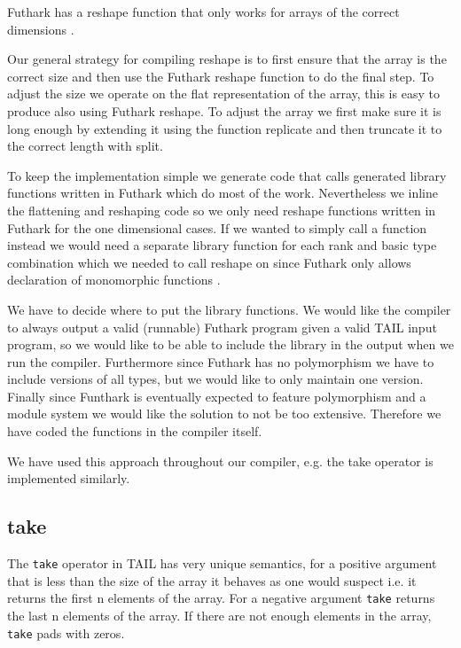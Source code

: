 \documentclass[11pt]{article}
\begin{document}
Futhark has a reshape function that only works for arrays of the correct dimensions \cite{TroelsHenriksen}.

Our general strategy for compiling reshape is to first ensure that the array is the correct size and then use the Futhark reshape
function to do the final step. To adjust the size we operate on the flat representation of the array, this is easy to produce also
using Futhark reshape. To adjust the array we first make sure it is long enough by extending it using the function replicate and then
truncate it to the correct length with split.

To keep the implementation simple we generate code that calls generated library functions written in Futhark which do most of the work.
Nevertheless we inline the flattening and reshaping code so we only need reshape functions written in Futhark
for the one dimensional cases. If we wanted to simply call a function instead we would need a separate library function for each
rank and basic type combination which we needed to call reshape on since Futhark only allows declaration of monomorphic functions \cite{TroelsHenriksen}.

We have to decide where to put the library functions.
We would like the compiler to always output a valid (runnable) Futhark program given a valid TAIL input program, so we would like to
be able to include the library in the output when we run the compiler.
Furthermore since Futhark has no polymorphism we have to include versions of all types, but we would like to only maintain one version.
Finally since Funthark is eventually expected to feature polymorphism and a module system we would like the solution to not be too
extensive\cite{TroelsHenriksen}. Therefore we have coded the functions in the compiler itself.

We have used this approach throughout our compiler, e.g. the take operator is implemented similarly.

\subsection{take} 

The {\tt take} operator in TAIL has very unique semantics, for a positive argument that is less than the size of the array it behaves as one would suspect i.e. it returns the first n elements of the array.
For a negative argument {\tt take} returns the last n elements of the array.
If there are not enough elements in the array, {\tt take} pads with zeros.
\end{document}
